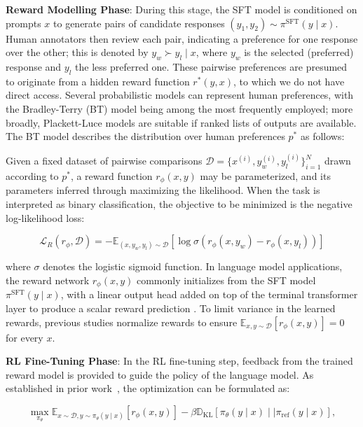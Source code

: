 \textbf{Reward Modelling Phase}: During this stage, the SFT model is conditioned on prompts $x$ to generate pairs of candidate responses $(y_1, y_2)\sim \pi^\text{SFT}(y \mid x)$. Human annotators then review each pair, indicating a preference for one response over the other; this is denoted by $y_w\succ y_l \mid x$, where $y_w$ is the selected (preferred) response and $y_l$ the less preferred one. These pairwise preferences are presumed to originate from a hidden reward function $r^*(y, x)$, to which we do not have direct access. Several probabilistic models can represent human preferences, with the Bradley-Terry (BT) model \cite{bradley1952rankanalysis} being among the most frequently employed; more broadly, Plackett-Luce models \citep{plackett1975analysis, luce2012individual} are suitable if ranked lists of outputs are available. The BT model describes the distribution over human preferences $p^*$ as follows:

Given a fixed dataset of pairwise comparisons $\mathcal{D} = \{x^{(i)}, y_w^{(i)}, y_l^{(i)}\}_{i=1}^N$ drawn according to $p^*$, a reward function $r_\phi(x, y)$ may be parameterized, and its parameters inferred through maximizing the likelihood. When the task is interpreted as binary classification, the objective to be minimized is the negative log-likelihood loss:

\begin{equation}\label{eq:reward_model}
    \mathcal{L}_R(r_{\phi}, \mathcal{D}) = -\mathbb{E}_{(x, y_w, y_l)\sim \mathcal{D}}\left[\log \sigma(r_{\phi}(x, y_w)- r_{\phi}(x, y_l))\right]
\end{equation}

where $\sigma$ denotes the logistic sigmoid function. In language model applications, the reward network $r_{\phi}(x, y)$ commonly initializes from the SFT model $\pi^\text{SFT}(y \mid x)$, with a linear output head added on top of the terminal transformer layer to produce a scalar reward prediction \cite{ziegler2020finetuning}. To limit variance in the learned rewards, previous studies normalize rewards to ensure $\mathbb{E}_{x,y\sim \mathcal{D}}\left[r_\phi(x, y)\right] = 0$ for every $x$.

\textbf{RL Fine-Tuning Phase}: In the RL fine-tuning step, feedback from the trained reward model is provided to guide the policy of the language model. As established in prior work~\citep{jaques2017sequence, jaques2020human}, the optimization can be formulated as:

\begin{equation}\label{eq:RL}
\max_{\pi_{\theta}}  \mathbb{E}_{x\sim \mathcal{D}, y\sim \pi_{\theta}(y \mid x)}\left[r_{\phi}(x, y)\right] - \beta\mathbb{D}_{\textrm{KL}}\left[\pi_{\theta}(y\mid x)\mid \mid \pi_\text{ref}(y\mid x)\right],
\end{equation}

